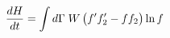 \documentclass[preview]{standalone}
\begin{document}
\begin{align*}
\special{dvisvgm:raw <g id='unique000'>}\dv{H}{t}=\int d\Gamma\;W\,\big(f'f_2'-ff_2\big)\ln f\special{dvisvgm:raw </g>}
\end{align*}
\end{document}
